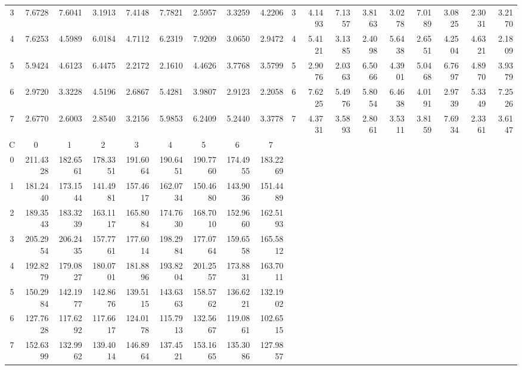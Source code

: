 \documentclass{article}
\begin{document}
\begin{adjustbox}{angle=90}
{\begin{tabular}{|c|rrrrrrrr|c|rrrrrrrr|}
3 & 7.6728 & 7.6041 & 3.1913 & 7.4148 & 7.7821 & 2.5957 & 3.3259 & 4.2206 & 3 & 4.1493 & 7.1357 & 3.8163 & 3.0278 & 7.0189 & 3.0825 & 2.3031 & 3.2170 \\
4 & 7.6253 & 4.5989 & 6.0184 & 4.7112 & 6.2319 & 7.9209 & 3.0650 & 2.9472 & 4 & 5.4121 & 3.1385 & 2.4098 & 5.6438 & 2.6551 & 4.2504 & 4.6321 & 2.1809 \\
5 & 5.9424 & 4.6123 & 6.4475 & 2.2172 & 2.1610 & 4.4626 & 3.7768 & 3.5799 & 5 & 2.9076 & 2.0363 & 6.5066 & 4.3901 & 5.0468 & 6.7697 & 4.8970 & 3.9379 \\
6 & 2.9720 & 3.3228 & 4.5196 & 2.6867 & 5.4281 & 3.9807 & 2.9123 & 2.2058 & 6 & 7.6225 & 5.4976 & 5.8054 & 6.4638 & 4.0191 & 2.9739 & 5.3349 & 7.2526 \\
7 & 2.6770 & 2.6003 & 2.8540 & 3.2156 & 5.9853 & 6.2409 & 5.2440 & 3.3778 & 7 & 4.3731 & 3.5893 & 2.8061 & 3.5311 & 3.8159 & 7.6934 & 2.3361 & 3.6147 \\ \hline
C & \multicolumn{1}{c}{0} & \multicolumn{1}{c}{1} & \multicolumn{1}{c}{2} & \multicolumn{1}{c}{3} & \multicolumn{1}{c}{4} & \multicolumn{1}{c}{5} & \multicolumn{1}{c}{6} & \multicolumn{1}{c|}{7} &  & \multicolumn{1}{c}{} & \multicolumn{1}{c}{} & \multicolumn{1}{c}{} & \multicolumn{1}{c}{} & \multicolumn{1}{c}{} & \multicolumn{1}{c}{} & \multicolumn{1}{c}{} & \multicolumn{1}{c|}{} \\ \hline
0 & 211.4328 & 182.6561 & 178.3351 & 191.6064 & 190.6451 & 190.7760 & 174.4955 & 183.2269 &  &  &  &  &  &  &  &  &  \\
1 & 181.2440 & 173.1544 & 141.4981 & 157.4617 & 162.0734 & 150.4680 & 143.9036 & 151.4489 &  &  &  &  &  &  &  &  &  \\
2 & 189.3543 & 183.3239 & 163.1117 & 165.8084 & 174.7630 & 168.7010 & 152.9660 & 162.5193 &  &  &  &  &  &  &  &  &  \\
3 & 205.2954 & 206.2435 & 157.7761 & 177.6014 & 198.2984 & 177.0764 & 159.6558 & 165.5812 &  &  &  &  &  &  &  &  &  \\
4 & 192.8279 & 179.0827 & 180.0701 & 181.8896 & 193.8204 & 201.2557 & 173.8831 & 163.7011 &  &  &  &  &  &  &  &  &  \\
5 & 150.2984 & 142.1977 & 142.8676 & 139.5115 & 143.6363 & 158.5762 & 136.6221 & 132.1902 &  &  &  &  &  &  &  &  &  \\
6 & 127.7628 & 117.6292 & 117.6617 & 124.0178 & 115.7913 & 132.5667 & 119.0861 & 102.6515 &  &  &  &  &  &  &  &  &  \\
7 & 152.6399 & 132.9962 & 139.4014 & 146.8964 & 137.4521 & 153.1665 & 135.3086 & 127.9857 &  &  &  &  &  &  &  &  &  \\ \hline
\end{tabular} \newline
}\end{adjustbox}
\hfill
\null
\end{document}
